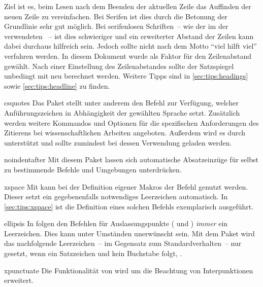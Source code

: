 \begin{packages}
  Ziel ist es, beim Lesen nach dem Beenden der aktuellen Zeile das Auffinden 
  der neuen Zeile zu vereinfachen. Bei Serifen ist dies durch die Betonung der 
  Grundlinie sehr gut möglich. Bei serifenlosen Schriften~-- wie der im \CD der 
  \TnUD verwendeten \Univers~-- ist dies schwieriger und ein erweiterter 
  Abstand der   Zeilen kann dabei durchaus hilfreich sein. Jedoch sollte nicht 
  nach dem Motto \enquote{viel hilft viel} verfahren werden. In diesem Dokument 
  wurde als Faktor für den Zeilenabstand  
  gewählt. Nach einer Einstellung des Zeilenabstandes sollte der Satzspiegel 
  unbedingt mit  neu berechnet werden. Weitere Tipps sind 
  in \autoref{sec:tips:headings} sowie \autoref{sec:tips:headline} zu finden.
\item[csquotes]%
  Das Paket stellt unter anderem den Befehl  
  zur Verfügung, welcher Anführungszeichen in Abhängigkeit der gewählten 
  Sprache setzt. Zusätzlich werden weitere Kommandos und Optionen für die 
  spezifischen Anforderungen des Zitierens bei wissenschaftlichen Arbeiten 
  angeboten. Außerdem wird es durch  unterstützt und sollte 
  zumindest bei dessen Verwendung geladen werden.
\item[noindentafter]
  Mit diesem Paket lassen sich automatische Absatzeinzüge für selbst zu 
  bestimmende Befehle und Umgebungen unterdrücken.
\item[xspace]%
  Mit  kann bei der Definition eigener Makros der Befehl 
   genutzt werden. Dieser setzt ein gegebenenfalls notwendiges 
  Leerzeichen automatisch. In \autoref{sec:tips:xspace} ist die Definition 
  eines solchen Befehls exemplarisch ausgeführt.
\item[ellipsis]%
  In  folgen den Befehlen für Auslassungspunkte ( und 
  ) \emph{immer} ein Leerzeichen. Dies kann unter Umständen 
  unerwünscht sein. Mit dem Paket  wird das nachfolgende 
  Leerzeichen~-- im Gegensatz zum Standardverhalten~-- nur gesetzt, wenn ein 
  Satzzeichen und kein Buchstabe folgt, .
\item[xpunctuate]%
  Die Funktionalität von  wird um die Beachtung von 
  Interpunktionen erweitert.

\end{packages}
